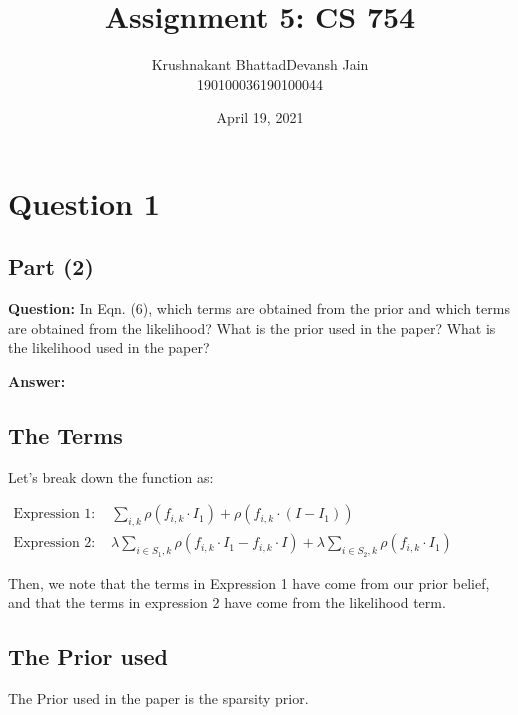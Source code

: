 \documentclass[fleqn, 11pt]{article}
\title{Assignment 5: CS 754}
\author{ 
\begin{tabular}{|c|c|}
     \hline
     \textsf{Krushnakant Bhattad} & \textsf{Devansh Jain} \\
     \hline
     \textsf{190100036} & \textsf{190100044}\\
     \hline
\end{tabular}
}
\date{April 19, 2021}
\renewcommand{\arraystretch}{2}%
\begin{document}
\maketitle
\tableofcontents
\thispagestyle{empty}
\setcounter{page}{0}

\renewcommand{\arraystretch}{1}%

\newpage
\section*{Question 1}
\setcounter{equation}{0}

\subsection*{Part (2)}

\textbf{Question: }
In Eqn. (6), which terms are obtained from the prior and which terms are obtained from the likelihood?
What is the prior used in the paper? What is the likelihood used in the paper?

\hrulefill

\textbf{Answer: }

\subsection*{The Terms}

Let's break down the function as: 
\begin{center}
$    \begin{aligned}
\text{Expression 1: } & \displaystyle \sum_{i,k} \rho(f_{i,k} \cdot I_1) + \rho(f_{i,k} \cdot (I-I_1)) \\
\text{Expression 2: } & \lambda \displaystyle \sum_{i \in S_1,k} \rho(f_{i,k} \cdot I_1 -  f_{i,k} \cdot I )  + 
\lambda \displaystyle \sum_{i \in S_2,k} \rho(f_{i,k} \cdot I_1 ) 
\end{aligned}$
\end{center}

Then, we note that the terms in Expression 1 have come from our prior belief, 
and that the terms in expression 2 have come from the likelihood term.


\subsection*{The Prior used}

The Prior used in the paper is the sparsity prior.

\smallskip
\end{document}
